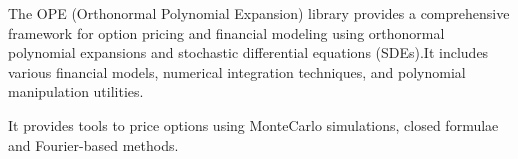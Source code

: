 The OPE (Orthonormal Polynomial Expansion) library provides a comprehensive framework for option pricing and financial modeling using orthonormal polynomial expansions and stochastic differential equations (SDEs).It includes various financial models, numerical integration techniques, and polynomial manipulation utilities.

It provides tools to price options using Monte\+Carlo simulations, closed formulae and Fourier-\/based methods. 